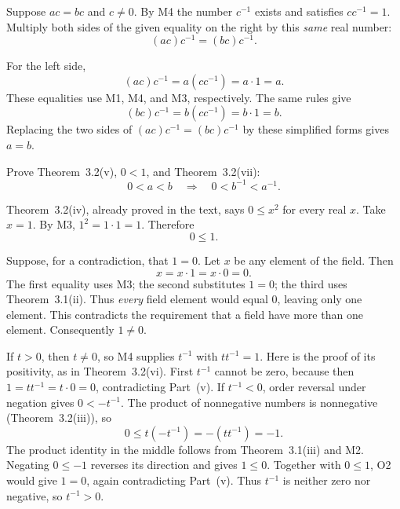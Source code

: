 
Suppose $ac=bc$ and $c\ne0$. By M4 the number $c^{-1}$ exists and
satisfies $cc^{-1}=1$. Multiply both sides of the given equality on the
right by this \emph{same} real number:
\[
 (ac)c^{-1}=(bc)c^{-1}.
\]

For the left side,
\[
 (ac)c^{-1}=a(cc^{-1})=a\cdot1=a.
\]
These equalities use M1, M4, and M3, respectively. The same rules give
\[
 (bc)c^{-1}=b(cc^{-1})=b\cdot1=b.
\]
Replacing the two sides of $(ac)c^{-1}=(bc)c^{-1}$ by these simplified
forms gives $a=b$.



\goal Prove Theorem~3.2(v), $0<1$, and Theorem~3.2(vii):
\[
 0<a<b\quad\Longrightarrow\quad0<b^{-1}<a^{-1}.
\]

Theorem~3.2(iv), already proved in the text, says $0\le x^2$ for every
real $x$. Take $x=1$. By M3, $1^2=1\cdot1=1$. Therefore
\[
 0\le1.
\]

Suppose, for a contradiction, that $1=0$. Let $x$ be any element of the
field. Then
\[
 x=x\cdot1=x\cdot0=0.
\]
The first equality uses M3; the second substitutes $1=0$; the third uses
Theorem~3.1(ii). Thus \emph{every} field element would equal $0$, leaving
only one element. This contradicts the requirement that a field have
more than one element. Consequently $1\ne0$.


If $t>0$, then $t\ne0$, so M4 supplies $t^{-1}$ with $tt^{-1}=1$.
Here is the proof of its positivity, as in Theorem~3.2(vi).
First $t^{-1}$ cannot be zero, because then
$1=tt^{-1}=t\cdot0=0$, contradicting Part~(v).
If $t^{-1}<0$, order reversal under negation gives $0<-t^{-1}$.
The product of nonnegative numbers is nonnegative
(Theorem~3.2(iii)), so
\[
 0\le t(-t^{-1})=-(tt^{-1})=-1.
\]
The product identity in the middle follows from Theorem~3.1(iii) and
M2. Negating $0\le-1$ reverses its direction and gives $1\le0$.
Together with $0\le1$, O2 would give $1=0$, again contradicting
Part~(v). Thus $t^{-1}$ is neither zero nor negative, so $t^{-1}>0$.

